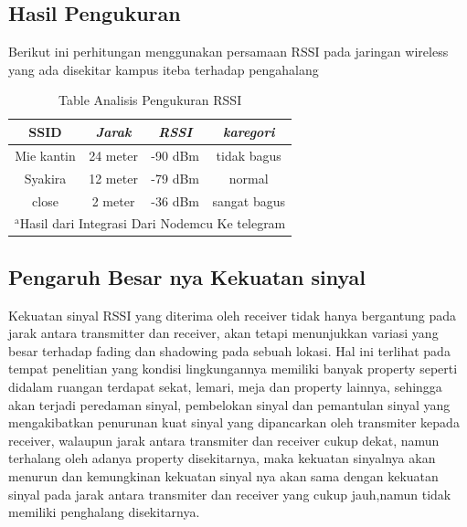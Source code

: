 \documentclass[conference]{IEEEtran}
\begin{document}
\subsection{Hasil Pengukuran}
Berikut ini perhitungan menggunakan persamaan RSSI 
pada jaringan wireless yang ada disekitar 
kampus iteba terhadap pengahalang

    \begin{table}[htbp]
    \caption{Table Analisis Pengukuran RSSI}
    \begin{center}
    \begin{tabular}{|c|c|c|c|}
        \hline
    \textbf{SSID} & \textbf{\textit{Jarak}}& \textbf{\textit{RSSI}}& \textbf{\textit{karegori}} \\
    \hline
    Mie kantin & 24 meter& -90 dBm & tidak bagus  \\
    \hline
    Syakira & 12 meter& -79 dBm & normal  \\
    \hline
    close & 2 meter& -36 dBm & sangat bagus   \\
    \hline
    \multicolumn{4}{l}{$^{\mathrm{a}}$Hasil dari Integrasi Dari Nodemcu Ke telegram}
    \end{tabular}
    \label{tab1}
    \end{center}
    \end{table}

\subsection{Pengaruh Besar nya Kekuatan sinyal}
Kekuatan sinyal RSSI yang diterima oleh
receiver tidak hanya bergantung pada jarak
antara transmitter dan receiver, akan tetapi
menunjukkan variasi yang besar terhadap fading
dan shadowing pada sebuah lokasi. Hal ini
terlihat pada tempat penelitian yang kondisi
lingkungannya memiliki banyak property seperti
didalam ruangan terdapat sekat, lemari, meja dan
property lainnya, sehingga akan terjadi peredaman sinyal, 
pembelokan sinyal dan pemantulan
sinyal yang mengakibatkan penurunan kuat
sinyal yang dipancarkan oleh transmiter kepada
receiver, walaupun jarak antara transmiter dan
receiver cukup dekat, namun terhalang oleh
adanya property disekitarnya, maka kekuatan
sinyalnya akan menurun dan kemungkinan
kekuatan sinyal nya akan sama dengan kekuatan
sinyal pada jarak antara transmiter dan receiver
yang cukup jauh,namun tidak memiliki
penghalang disekitarnya.



% 
% 
\end{document}
